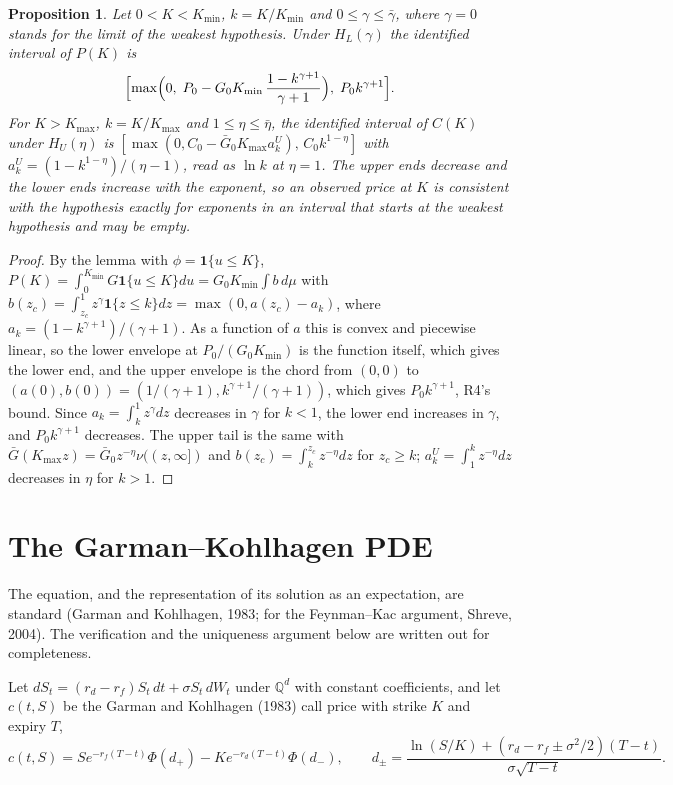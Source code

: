 \documentclass[11pt]{article}
\newtheorem{proposition}{Proposition}
\theoremstyle{remark}
\newcommand{\Q}{\mathbb{Q}}
\begin{document}
\begin{proposition}
Let $0<K<K_{\min}$, $k=K/K_{\min}$ and $0\le\gamma\le\bar\gamma$, where $\gamma=0$ stands for the limit of the weakest hypothesis. Under $H_L(\gamma)$ the identified interval of $P(K)$ is
\[
\Bigl[\max\Bigl(0,\;P_0-G_0K_{\min}\,\frac{1-k^{\gamma+1}}{\gamma+1}\Bigr),\;P_0k^{\gamma+1}\Bigr].
\]
For $K>K_{\max}$, $k=K/K_{\max}$ and $1\le\eta\le\bar\eta$, the identified interval of $C(K)$ under $H_U(\eta)$ is $[\max(0,C_0-\bar G_0K_{\max}a^U_k),\,C_0k^{1-\eta}]$ with $a^U_k=(1-k^{1-\eta})/(\eta-1)$, read as $\ln k$ at $\eta=1$. The upper ends decrease and the lower ends increase with the exponent, so an observed price at $K$ is consistent with the hypothesis exactly for exponents in an interval that starts at the weakest hypothesis and may be empty.
\end{proposition}

\begin{proof}
By the lemma with $\phi=\mathbf 1\{u\le K\}$, $P(K)=\int_0^{K_{\min}}G\mathbf 1\{u\le K\}du=G_0K_{\min}\int b\,d\mu$ with $b(z_c)=\int_{z_c}^1z^\gamma\mathbf 1\{z\le k\}dz=\max(0,a(z_c)-a_k)$, where $a_k=(1-k^{\gamma+1})/(\gamma+1)$. As a function of $a$ this is convex and piecewise linear, so the lower envelope at $P_0/(G_0K_{\min})$ is the function itself, which gives the lower end, and the upper envelope is the chord from $(0,0)$ to $(a(0),b(0))=(1/(\gamma+1),k^{\gamma+1}/(\gamma+1))$, which gives $P_0k^{\gamma+1}$, R4's bound. Since $a_k=\int_k^1z^\gamma dz$ decreases in $\gamma$ for $k<1$, the lower end increases in $\gamma$, and $P_0k^{\gamma+1}$ decreases. The upper tail is the same with $\bar G(K_{\max}z)=\bar G_0z^{-\eta}\nu((z,\infty])$ and $b(z_c)=\int_k^{z_c}z^{-\eta}dz$ for $z_c\ge k$; $a^U_k=\int_1^kz^{-\eta}dz$ decreases in $\eta$ for $k>1$.
\end{proof}

\section*{The Garman--Kohlhagen PDE}

The equation, and the representation of its solution as an expectation, are standard (Garman and Kohlhagen, 1983; for the Feynman--Kac argument, Shreve, 2004). The verification and the uniqueness argument below are written out for completeness.

Let $dS_t=(r_d-r_f)S_t\,dt+\sigma S_t\,dW_t$ under $\Q^d$ with constant coefficients, and let $c(t,S)$ be the Garman and Kohlhagen (1983) call price with strike $K$ and expiry $T$,
\[
c(t,S)=Se^{-r_f(T-t)}\Phi(d_+)-Ke^{-r_d(T-t)}\Phi(d_-),\qquad d_\pm=\frac{\ln(S/K)+(r_d-r_f\pm\sigma^2/2)(T-t)}{\sigma\sqrt{T-t}}.
\]
\end{document}
